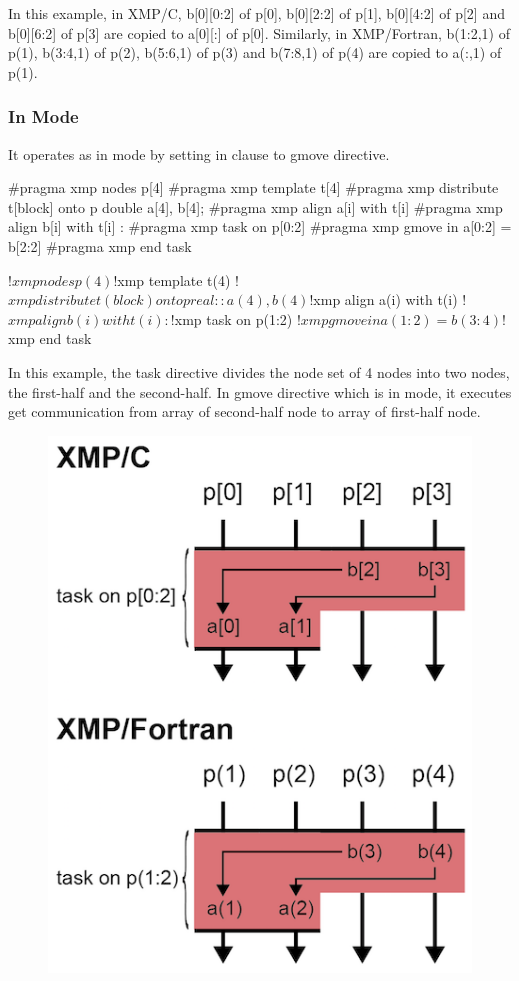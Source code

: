 In this example, in XMP/C, b[0][0:2] of p[0], b[0][2:2] of p[1],
b[0][4:2] of p[2] and b[0][6:2] of p[3] are copied to a[0][:] of
p[0]. Similarly, in XMP/Fortran, b(1:2,1) of p(1), b(3:4,1) of p(2),
b(5:6,1) of p(3) and b(7:8,1) of p(4) are copied to a(:,1) of p(1).

\subsubsection{In Mode}

It operates as in mode by setting in clause to gmove directive.

\begin{XCexample}
#pragma xmp nodes p[4]
#pragma xmp template t[4]
#pragma xmp distribute t[block] onto p
double a[4], b[4];
#pragma xmp align a[i] with t[i]
#pragma xmp align b[i] with t[i]
   :
#pragma xmp task on p[0:2]
#pragma xmp gmove in
  a[0:2] = b[2:2]
#pragma xmp end task
\end{XCexample}

\begin{XFexample}
!$xmp nodes p(4)
!$xmp template t(4)
!$xmp distribute t(block) onto p
real :: a(4), b(4)
!$xmp align a(i) with t(i)
!$xmp align b(i) with t(i)
   :
!$xmp task on p(1:2)
!$xmp gmove in
  a(1:2) = b(3:4)
!$xmp end task
\end{XFexample}

In this example, the task directive divides the node set of 4 nodes into
two nodes, the first-half and the second-half. In gmove directive which
is in mode, it executes get communication from array of second-half node
to array of first-half node.

\begin{figure}
  \centering
  \includegraphics{figs/gmove_in.png}
\end{figure}


